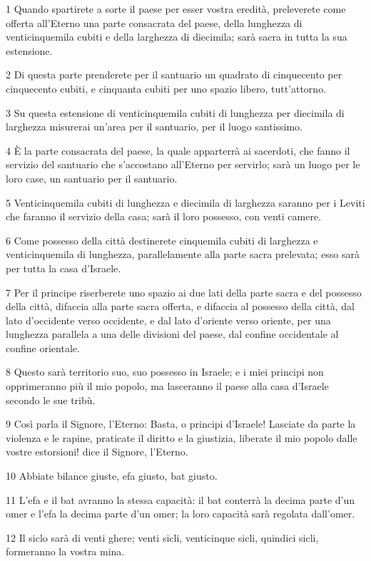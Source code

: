 \par 1 Quando spartirete a sorte il paese per esser vostra eredità, preleverete come offerta all'Eterno una parte consacrata del paese, della lunghezza di venticinquemila cubiti e della larghezza di diecimila; sarà sacra in tutta la sua estensione.
\par 2 Di questa parte prenderete per il santuario un quadrato di cinquecento per cinquecento cubiti, e cinquanta cubiti per uno spazio libero, tutt'attorno.
\par 3 Su questa estensione di venticinquemila cubiti di lunghezza per diecimila di larghezza misurerai un'area per il santuario, per il luogo santissimo.
\par 4 È la parte consacrata del paese, la quale apparterrà ai sacerdoti, che fanno il servizio del santuario che s'accostano all'Eterno per servirlo; sarà un luogo per le loro case, un santuario per il santuario.
\par 5 Venticinquemila cubiti di lunghezza e diecimila di larghezza saranno per i Leviti che faranno il servizio della casa; sarà il loro possesso, con venti camere.
\par 6 Come possesso della città destinerete cinquemila cubiti di larghezza e venticinquemila di lunghezza, parallelamente alla parte sacra prelevata; esso sarà per tutta la casa d'Israele.
\par 7 Per il principe riserberete uno spazio ai due lati della parte sacra e del possesso della città, difaccia alla parte sacra offerta, e difaccia al possesso della città, dal lato d'occidente verso occidente, e dal lato d'oriente verso oriente, per una lunghezza parallela a una delle divisioni del paese, dal confine occidentale al confine orientale.
\par 8 Questo sarà territorio suo, suo possesso in Israele; e i miei principi non opprimeranno più il mio popolo, ma lasceranno il paese alla casa d'Israele secondo le sue tribù.
\par 9 Così parla il Signore, l'Eterno: Basta, o principi d'Israele! Lasciate da parte la violenza e le rapine, praticate il diritto e la giustizia, liberate il mio popolo dalle vostre estorsioni! dice il Signore, l'Eterno.
\par 10 Abbiate bilance giuste, efa giusto, bat giusto.
\par 11 L'efa e il bat avranno la stessa capacità: il bat conterrà la decima parte d'un omer e l'efa la decima parte d'un omer; la loro capacità sarà regolata dall'omer.
\par 12 Il siclo sarà di venti ghere; venti sicli, venticinque sicli, quindici sicli, formeranno la vostra mina.
